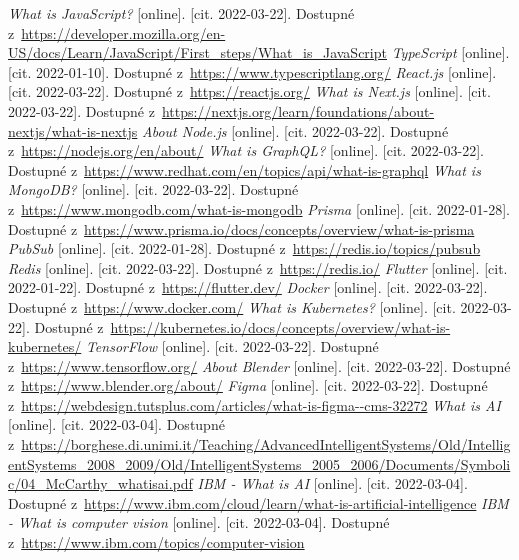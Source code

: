 \begin{thebibliography}{99}
     \textit{What is JavaScript?} [online]. [cit. 2022-03-22]. Dostupné z~\url{https://developer.mozilla.org/en-US/docs/Learn/JavaScript/First_steps/What_is_JavaScript}
     \textit{TypeScript} [online]. [cit. 2022-01-10]. Dostupné z~\url{https://www.typescriptlang.org/}
     \textit{React.js} [online]. [cit. 2022-03-22]. Dostupné z~\url{https://reactjs.org/}
     \textit{What is Next.js} [online]. [cit. 2022-03-22]. Dostupné z~\url{https://nextjs.org/learn/foundations/about-nextjs/what-is-nextjs}
     \textit{About Node.js} [online]. [cit. 2022-03-22]. Dostupné z~\url{https://nodejs.org/en/about/}
     \textit{What is GraphQL?} [online]. [cit. 2022-03-22]. Dostupné z~\url{https://www.redhat.com/en/topics/api/what-is-graphql}
     \textit{What is MongoDB?} [online]. [cit. 2022-03-22]. Dostupné z~\url{https://www.mongodb.com/what-is-mongodb}
     \textit{Prisma} [online]. [cit. 2022-01-28]. Dostupné z~\url{https://www.prisma.io/docs/concepts/overview/what-is-prisma}
     \textit{PubSub} [online]. [cit. 2022-01-28]. Dostupné z~\url{https://redis.io/topics/pubsub}
     \textit{Redis} [online]. [cit. 2022-03-22]. Dostupné z~\url{https://redis.io/}
     \textit{Flutter} [online]. [cit. 2022-01-22]. Dostupné z~\url{https://flutter.dev/}
     \textit{Docker} [online]. [cit. 2022-03-22]. Dostupné z~\url{https://www.docker.com/}
     \textit{What is Kubernetes?} [online]. [cit. 2022-03-22]. Dostupné z~\url{https://kubernetes.io/docs/concepts/overview/what-is-kubernetes/}
     \textit{TensorFlow} [online]. [cit. 2022-03-22]. Dostupné z~\url{https://www.tensorflow.org/}
     \textit{About Blender} [online]. [cit. 2022-03-22]. Dostupné z~\url{https://www.blender.org/about/}
     \textit{Figma} [online]. [cit. 2022-03-22]. Dostupné z~\url{https://webdesign.tutsplus.com/articles/what-is-figma--cms-32272}
     \textit{What is AI} [online]. [cit. 2022-03-04]. Dostupné z~\url{https://borghese.di.unimi.it/Teaching/AdvancedIntelligentSystems/Old/IntelligentSystems_2008_2009/Old/IntelligentSystems_2005_2006/Documents/Symbolic/04_McCarthy_whatisai.pdf}
     \textit{IBM - What is AI} [online]. [cit. 2022-03-04]. Dostupné z~\url{https://www.ibm.com/cloud/learn/what-is-artificial-intelligence}
     \textit{IBM - What is computer vision} [online]. [cit. 2022-03-04]. Dostupné z~\url{https://www.ibm.com/topics/computer-vision}

\end{thebibliography}
